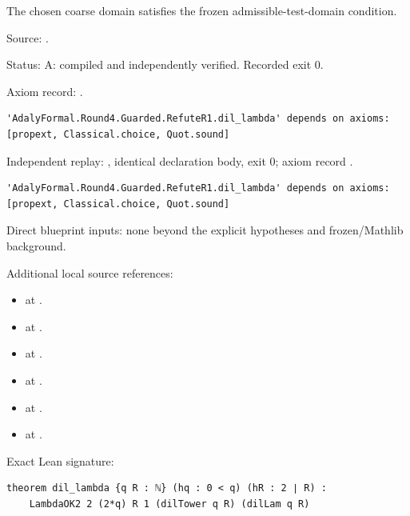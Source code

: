 \begin{theorem}[bp-029]
\label{bp-029}
\uses{}
\leanok
The chosen coarse domain satisfies the frozen admissible-test-domain condition.

\par Source: \texttt{}.
\par Status: A: compiled and independently verified. Recorded exit 0.
\par Axiom record: \texttt{}.
\begin{verbatim}
'AdalyFormal.Round4.Guarded.RefuteR1.dil_lambda' depends on axioms: [propext, Classical.choice, Quot.sound]
\end{verbatim}
\par Independent replay: \texttt{}, identical declaration body, exit 0; axiom record \texttt{}.
\begin{verbatim}
'AdalyFormal.Round4.Guarded.RefuteR1.dil_lambda' depends on axioms: [propext, Classical.choice, Quot.sound]
\end{verbatim}
\par Direct blueprint inputs: none beyond the explicit hypotheses and frozen/Mathlib background.
\par Additional local source references:
\begin{itemize}
\item \texttt{} at \texttt{}.
\item \texttt{} at \texttt{}.
\item \texttt{} at \texttt{}.
\item \texttt{} at \texttt{}.
\item \texttt{} at \texttt{}.
\item \texttt{} at \texttt{}.
\end{itemize}
\par Exact Lean signature:
\begin{verbatim}
theorem dil_lambda {q R : ℕ} (hq : 0 < q) (hR : 2 ∣ R) :
    LambdaOK2 2 (2*q) R 1 (dilTower q R) (dilLam q R)
\end{verbatim}
\end{theorem}

